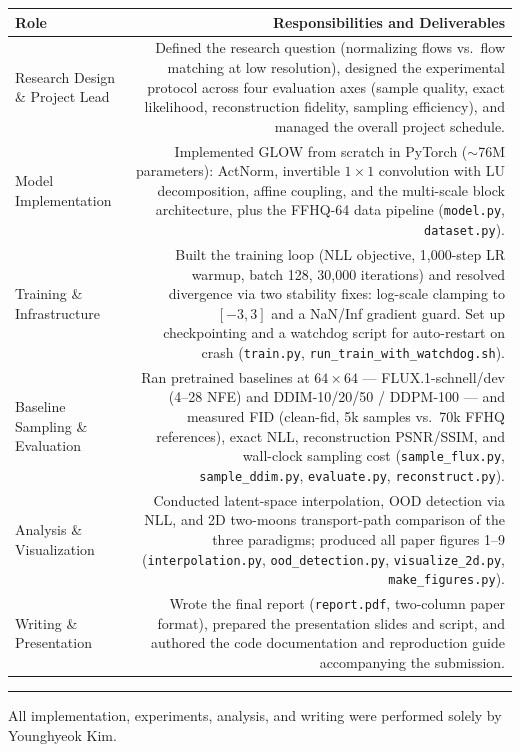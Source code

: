 \documentclass[11pt]{article}
\begin{document}
\begin{tabularx}{\textwidth}{@{}LR@{}}
    \toprule
    \textbf{Role} & \textbf{Responsibilities and Deliverables} \\
    \midrule
    Research Design \& Project Lead &
    Defined the research question (normalizing flows vs.\ flow matching at low
    resolution), designed the experimental protocol across four evaluation axes
    (sample quality, exact likelihood, reconstruction fidelity, sampling
    efficiency), and managed the overall project schedule. \\
    \addlinespace[2pt]
    Model Implementation &
    Implemented GLOW from scratch in PyTorch ($\sim$76M parameters): ActNorm,
    invertible $1\times1$ convolution with LU decomposition, affine coupling,
    and the multi-scale block architecture, plus the FFHQ-64 data pipeline
    (\texttt{model.py}, \texttt{dataset.py}). \\
    \addlinespace[2pt]
    Training \& Infrastructure &
    Built the training loop (NLL objective, 1{,}000-step LR warmup, batch 128,
    30{,}000 iterations) and resolved divergence via two stability fixes:
    log-scale clamping to $[-3,3]$ and a NaN/Inf gradient guard. Set up
    checkpointing and a watchdog script for auto-restart on crash
    (\texttt{train.py}, \texttt{run\_train\_with\_watchdog.sh}). \\
    \addlinespace[2pt]
    Baseline Sampling \& Evaluation &
    Ran pretrained baselines at $64\times64$ --- FLUX.1-schnell/dev (4--28 NFE)
    and DDIM-10/20/50 / DDPM-100 --- and measured FID (clean-fid, 5k samples vs.\
    70k FFHQ references), exact NLL, reconstruction PSNR/SSIM, and wall-clock
    sampling cost (\texttt{sample\_flux.py}, \texttt{sample\_ddim.py},
    \texttt{evaluate.py}, \texttt{reconstruct.py}). \\
    \addlinespace[2pt]
    Analysis \& Visualization &
    Conducted latent-space interpolation, OOD detection via NLL, and 2D
    two-moons transport-path comparison of the three paradigms; produced all
    paper figures 1--9 (\texttt{interpolation.py}, \texttt{ood\_detection.py},
    \texttt{visualize\_2d.py}, \texttt{make\_figures.py}). \\
    \addlinespace[2pt]
    Writing \& Presentation &
    Wrote the final report (\texttt{report.pdf}, two-column paper format),
    prepared the presentation slides and script, and authored the code
    documentation and reproduction guide accompanying the submission. \\
    \bottomrule
\end{tabularx}

\vspace{14pt}
\hrule
\vspace{6pt}
{\small All implementation, experiments, analysis, and writing were performed
solely by Younghyeok Kim.}
\end{document}
